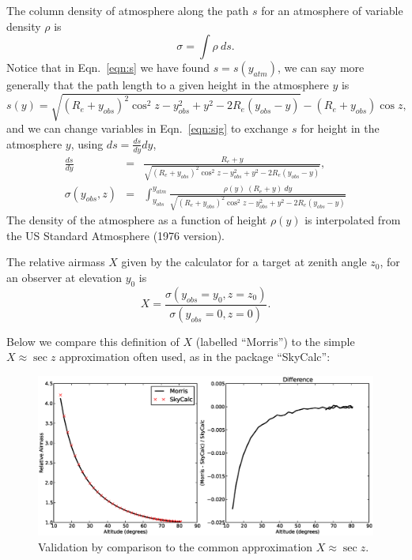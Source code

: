 \documentclass[a4paper]{article}
\newcommand{\yobs}{y_{obs}}
\newcommand{\yatm}{y_{atm}}
\begin{document}
The column density of atmosphere along the path $s$ for an atmosphere of variable density $\rho$ is 
\begin{equation}
\sigma = \int \rho ~ ds. \label{eqn:sig}
\end{equation}
Notice that in Eqn.~\ref{eqn:s} we have found $s=s(\yatm)$, we can say more generally that the path length to a given height in the atmosphere $y$ is 
\begin{equation}
s(y) = \sqrt{ (R_e + \yobs)^2\cos^2 z - \yobs^2 + y^2 - 2R_e(\yobs-y)} - (R_e + \yobs)\cos z,
\end{equation}
and we can change variables in Eqn.~\ref{eqn:sig} to exchange $s$ for height in the atmosphere $y$, using $ds = \frac{ds}{dy} dy$, 
\begin{eqnarray}
\frac{ds}{dy} &=& \frac{R_e + y}{\sqrt{ (R_e + \yobs)^2\cos^2 z - \yobs^2 + y^2 - 2R_e(\yobs - y) }},\\
\sigma(\yobs,z) &=& \int^{\yatm}_{\yobs}  \frac{\rho(y)~\left(R_e + y\right)~dy}{\sqrt{ (R_e + \yobs)^2\cos^2 z - \yobs^2 + y^2 - 2R_e(\yobs - y) }}
\end{eqnarray}
The density of the atmosphere as a function of height $\rho(y)$ is interpolated from the US Standard Atmosphere (1976 version). 


The relative airmass $X$ given by the calculator for a target at zenith angle $z_0$, for an observer at elevation $y_0$ is
\begin{equation}
X = \frac{\sigma(\yobs=y_0,z=z_0)}{\sigma(\yobs=0,z=0)}.
\end{equation}


Below we compare this definition of $X$ (labelled ``Morris'') to the simple $X \approx \sec z$ approximation often used, as in the package ``SkyCalc'':
\begin{figure}[H]
\begin{center}
\includegraphics[scale=0.5]{figs/validation.eps}
\caption{Validation by comparison to the common approximation $X \approx \sec z$.}
\end{center}
\end{figure}
\end{document}
